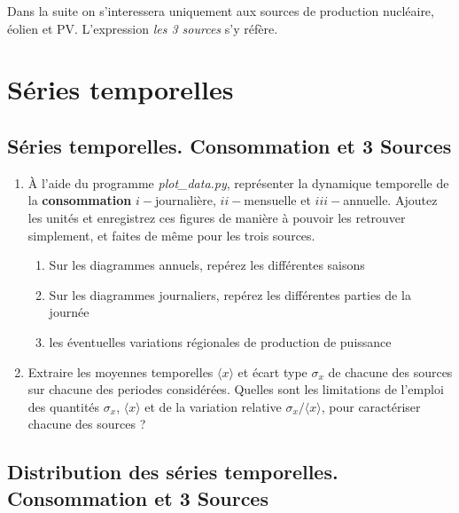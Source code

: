 \documentclass[12pt,a4,french]{article}
\newcommand{\tmtextbf}[1]{{\bfseries{#1}}}
\newcommand{\tmtextit}[1]{{\itshape{#1}}}
\begin{document}
Dans la suite on s'interessera uniquement aux sources de production
nucléaire, éolien et PV. L'expression \tmtextit{les 3 sources} s'y
réfère.


\section{Séries temporelles}


\subsection{Séries temporelles. Consommation et 3 Sources}

\begin{enumerate}
  \item À l'aide du programme \tmtextit{plot\_data.py}, représenter la
  dynamique temporelle de la \tmtextbf{consommation} $i-$journalière, $ii-$mensuelle
  et $iii-$annuelle. Ajoutez les unités et enregistrez ces figures de manière à
  pouvoir les retrouver simplement, et faites de même pour les trois sources.
 
  \begin{enumerate}
    \item Sur les diagrammes annuels, repérez les différentes saisons
    
    \item Sur les diagrammes journaliers, repérez les différentes parties de
    la journée
    
    \item les éventuelles variations régionales de production de puissance
  \end{enumerate}
  \item Extraire les moyennes temporelles $\langle x \rangle$ et écart type
  $\sigma_x$ de chacune des sources sur chacune des periodes considérées.
  Quelles sont les limitations de l'emploi des quantités $\sigma_x $, $ \langle
  x \rangle$ et de la variation relative $\sigma_x / \langle
  x \rangle$, pour caractériser chacune des sources ?
\end{enumerate}

\subsection{Distribution des séries temporelles. Consommation et 3 Sources}
\end{document}
